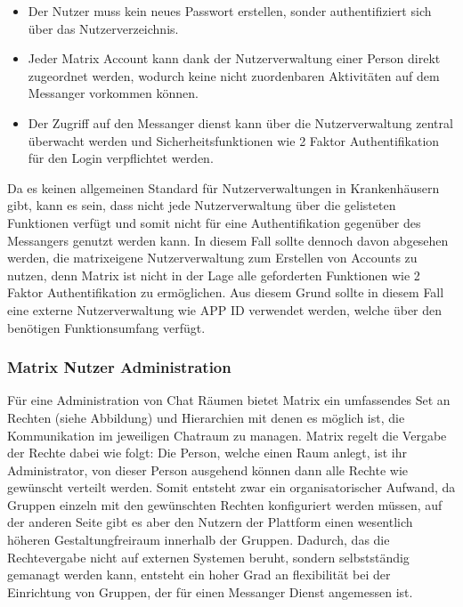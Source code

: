 \begin{itemize}
    \item Der Nutzer muss kein neues Passwort erstellen, sonder authentifiziert sich über das Nutzerverzeichnis.
    \item Jeder Matrix Account kann dank der Nutzerverwaltung einer Person direkt zugeordnet werden, wodurch keine nicht zuordenbaren Aktivitäten auf dem Messanger vorkommen können.  
    \item Der Zugriff auf den Messanger 
dienst kann über die Nutzerverwaltung zentral überwacht werden und Sicherheitsfunktionen wie 2 Faktor Authentifikation für den Login verpflichtet werden. 
\end{itemize}

Da es keinen allgemeinen Standard für Nutzerverwaltungen in Krankenhäusern gibt, kann es sein, dass nicht jede Nutzerverwaltung über die gelisteten Funktionen verfügt und somit nicht für eine Authentifikation gegenüber des Messangers genutzt werden kann. In diesem Fall sollte dennoch davon abgesehen werden, die matrixeigene Nutzerverwaltung zum Erstellen von Accounts zu nutzen, denn Matrix ist nicht in der Lage alle geforderten Funktionen wie 2 Faktor Authentifikation zu ermöglichen. Aus diesem Grund sollte in diesem Fall eine externe Nutzerverwaltung wie APP ID verwendet werden, welche über den benötigen Funktionsumfang verfügt.

\subsubsection{Matrix Nutzer Administration}\label{chapter:vdmf}
Für eine Administration von Chat Räumen bietet Matrix ein umfassendes Set an Rechten (siehe Abbildung) und Hierarchien mit denen es möglich ist, die Kommunikation im jeweiligen Chatraum zu managen. Matrix regelt die Vergabe der Rechte dabei wie folgt: Die Person, welche einen Raum anlegt, ist ihr Administrator, von dieser Person ausgehend können dann alle Rechte wie gewünscht verteilt werden. Somit entsteht zwar ein organisatorischer Aufwand, da Gruppen einzeln mit den gewünschten Rechten konfiguriert werden müssen, auf der anderen Seite gibt es aber den Nutzern der Plattform einen wesentlich höheren Gestaltungfreiraum innerhalb der Gruppen. Dadurch, das die Rechtevergabe nicht auf externen Systemen beruht, sondern selbstständig gemanagt werden kann, entsteht ein hoher Grad an flexibilität bei der Einrichtung von Gruppen, der für einen Messanger Dienst angemessen ist.


